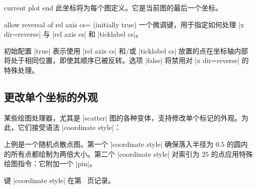 \begin{predefinednode}{current plot end}
    此坐标将为每个图定义。它是当前图的最后一个坐标。
\end{predefinednode}

\begin{pgfplotskey}{allow reversal of rel axis cs= (initially true)}
    一个微调键，用于指定如何处理 |x dir=reverse| 与 |rel axis cs| 和 |ticklabel cs|。

    初始配置 |true| 表示使用 |rel axis cs| 和/或 |ticklabel cs| 放置的点在坐标轴内部将处于相同位置，即使其顺序已被反转。选项 |false| 将禁用对 |x dir=reverse| 的特殊处理。
\end{pgfplotskey}


\subsection{更改单个坐标的外观}
\label{sec:coordinate:style}

某些绘图处理器，尤其是 |scatter| 图的各种变体，支持修改单个标记的外观。为此，它们接受语法 |coordinate style|：
%
\begin{codeexample}[]
\end{codeexample}
%
上例是一个随机点散点图。第一个 |coordinate style| 确保落入半径为 $0.5$ 的圆内的所有点都绘制为两倍大小。第二个 |coordinate style| 对索引为 $25$ 的点应用特殊绘图指令：它附加一个 |pin|。

键 |coordinate style| 在第~\pageref{key:coordinatestyle} 页记录。


